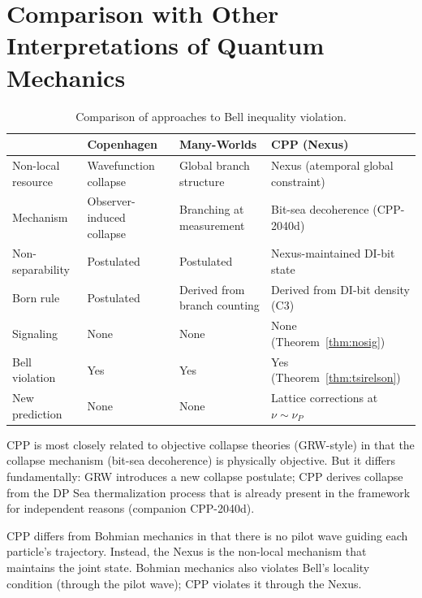 \documentclass[11pt,a4paper]{article}
\begin{document}
\section{Comparison with Other Interpretations of Quantum Mechanics}
\label{sec:compare}

\begin{table}[htbp]
\centering
\caption{Comparison of approaches to Bell inequality violation.}
\label{tab:compare}
\begin{tabular}{@{}p{3.2cm}p{3.5cm}p{3.5cm}p{3.5cm}@{}}
\toprule
 & Copenhagen & Many-Worlds & \textbf{CPP (Nexus)} \\
\midrule
Non-local resource & Wavefunction collapse & Global branch structure & Nexus (atemporal global constraint) \\
Mechanism & Observer-induced collapse & Branching at measurement & Bit-sea decoherence (CPP-2040d) \\
Non-separability & Postulated & Postulated & Nexus-maintained DI-bit state \\
Born rule & Postulated & Derived from branch counting & Derived from DI-bit density (C3) \\
Signaling & None & None & None (Theorem~\ref{thm:nosig}) \\
Bell violation & Yes & Yes & Yes (Theorem~\ref{thm:tsirelson}) \\
New prediction & None & None & Lattice corrections at $\nu \sim \nu_P$ \\
\bottomrule
\end{tabular}
\end{table}

CPP is most closely related to objective collapse theories (GRW-style)
in that the collapse mechanism (bit-sea decoherence) is physically
objective.  But it differs fundamentally: GRW introduces a new collapse
postulate; CPP derives collapse from the DP Sea thermalization process
that is already present in the framework for independent reasons
(companion CPP-2040d).

CPP differs from Bohmian mechanics in that there is no pilot wave
guiding each particle's trajectory.  Instead, the Nexus is the
non-local mechanism that maintains the joint state.  Bohmian mechanics
also violates Bell's locality condition (through the pilot wave); CPP
violates it through the Nexus.

\end{document}
